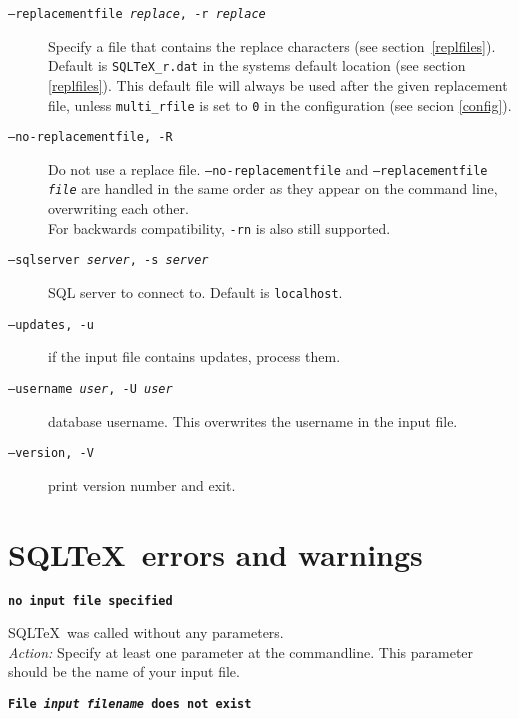 \documentclass{article}
\newcommand{\vs}{\vspace{3mm}}
\begin{document}
\begin{description}
\item[\texttt{--replacementfile \textit{replace}, -r \textit{replace}}] Specify a file that contains the replace characters (see section~\ref{replfiles}). \\
Default is \texttt{SQLTeX{\_}r.dat} in the systems default location (see section \ref{replfiles}). This default file will always be used after the given replacement file, unless \texttt{multi\_rfile} is set to \texttt{0} in the configuration (see secion \ref{config}).

\item[\texttt{--no-replacementfile, -R}] Do not use a replace file. \texttt{--no-replacementfile} and \texttt{--replacementfile \textit{file}} are handled in the same order as
they appear on the command line, overwriting each other.\\
For backwards compatibility, \texttt{-rn} is also still supported.

\item[\texttt{--sqlserver \textit{server}, -s \textit{server}}] SQL server to connect to. Default is \texttt{localhost}.

\item[\texttt{--updates, -u}] if the input file contains updates, process them.

\item[\texttt{--username \textit{user}, -U \textit{user}}] database username. This overwrites the username in the input file.

\item[\texttt{--version, -V}] print version number and exit.
\end{description}



\section{SQL\TeX\ errors and warnings}

\noindent\textbf{\texttt{no input file specified}}

\vspace{1mm}

\noindent SQL\TeX\ was called without any parameters.\\
\textit{Action:} Specify at least one parameter at the commandline. This parameter should be
the name of your input file.

\vs

\noindent\textbf{\texttt{File \textit{input filename} does not exist}}
\end{document}
